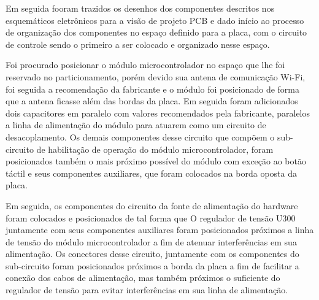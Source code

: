     \begin{figure}[h!]
            \captionsetup{width=16cm}
   \end{figure}


Em seguida fooram trazidos os desenhos dos componentes descritos nos esquemáticos eletrônicos para a visão de projeto PCB e dado início ao processo de organização dos componentes no espaço definido para a placa, com o circuito de controle sendo o primeiro a ser colocado e organizado nesse espaço.

Foi procurado posicionar o módulo microcontrolador no espaço que lhe foi reservado no particionamento, porém devido sua antena de comunicação Wi-Fi, foi seguida a recomendação da fabricante e o módulo foi posicionado de forma que a antena ficasse além das bordas da placa. Em seguida foram adicionados dois capacitores em paralelo com valores recomendados pela fabricante, paralelos a linha de alimentação do módulo para atuarem como um circuito de desacoplamento. Os demais componentes desse circuito que compõem o sub-circuito de habilitação de operação do módulo microcontrolador, foram posicionados também o mais próximo possível do módulo com exceção ao botão táctil e seus componentes auxiliares, que foram colocados na borda oposta da placa.

Em seguida, os componentes do circuito da fonte de alimentação do hardware foram colocados e posicionados de tal forma que O regulador de tensão U300 juntamente com seus componentes auxiliares foram posicionados próximos a linha de tensão do módulo microcontrolador a fim de atenuar interferências em sua alimentação. Os conectores desse circuito, juntamente com os componentes do sub-circuito foram posicionados próximos a borda da placa a fim de facilitar a conexão dos cabos de alimentação, mas também próximos o suficiente do regulador de tensão para evitar interferências em sua linha de alimentação. 

